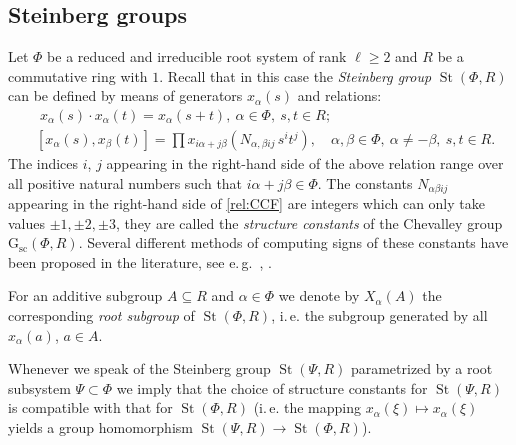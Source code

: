 \documentclass[10pt,a4paper,twoside]{article}
\theoremstyle{remark}
\theoremstyle{definition}
\numberwithin{lemma}{section}
\numberwithin{prop}{section}
\numberwithin{corollary}{section}
\numberwithin{externaltheorem}{section}
\DeclareMathOperator{\St}{St}
\newcommand{\GG}{\mathrm{G}_{\mathrm{sc}}}
\numberwithin{equation}{section}
\begin{document}
\subsection{Steinberg groups} \label{sec:Steinberg-intro}
Let $\Phi$ be a reduced and irreducible root system of rank $\ell \geq 2$ and $R$ be a commutative ring with $1$. Recall that in this case the \emph{Steinberg group} $\St(\Phi, R)$ can be defined by means of generators $x_{\alpha}(s)$ and relations:
\begin{align}
& \phantom{[}
x_\alpha(s) \cdot x_\alpha(t) = x_\alpha(s+t),\ \alpha\in\Phi,\ s,t\in R; \label{rel:add}\\
& [x_\alpha(s), x_\beta(t)] = \prod
 x_{i\alpha + j\beta}\left(N_{\alpha,\beta ij}\, s^i t^j\right),\quad \alpha,\beta\in\Phi,\ \alpha\neq-\beta,\ s,t\in R. \label{rel:CCF}
\end{align}
The indices $i$, $j$ appearing in the right-hand side of the above relation range over
all positive natural numbers such that $i\alpha + j\beta\in\Phi$.
The constants $N_{\alpha \beta i j}$ appearing in the right-hand side of \eqref{rel:CCF} are integers which can only take values $\pm 1,\pm 2,\pm 3$, they are called the {\it structure constants} of the Chevalley group $\GG(\Phi, R)$. Several different methods of computing signs of these constants have been proposed in the literature, see e.\,g.~\cite{V00}, \cite[\S~9]{VP}. 

For an additive subgroup $A\subseteq R$ and $\alpha \in \Phi$ we denote by $X_\alpha(A)$ the corresponding {\it root subgroup} of $\St(\Phi, R)$, i.\,e. the subgroup generated by all $x_\alpha(a)$, $a \in A$.

Whenever we speak of the Steinberg group $\St(\Psi, R)$ parametrized by a root subsystem $\Psi \subset \Phi$ we imply that the choice of structure constants 
 for $\St(\Psi, R)$ is compatible with that for $\St(\Phi, R)$ (i.\,e. the mapping $x_\alpha(\xi) \mapsto x_\alpha(\xi)$ yields a group homomorphism $\St(\Psi, R) \to \St(\Phi, R)$).
\end{document}
